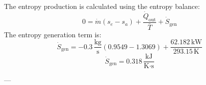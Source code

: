 The entropy production is calculated using the entropy balance:  
\[
0 = \dot{m} (s_e - s_a) + \frac{\dot{Q}_{\text{out}}}{\bar{T}} + \dot{S}_{\text{gen}}
\]  
The entropy generation term is:  
\[
\dot{S}_{\text{gen}} = -0.3 \, \frac{\text{kg}}{\text{s}} \left( 0.9549 - 1.3069 \right) + \frac{62.182 \, \text{kW}}{293.15 \, \text{K}}
\]  
\[
\dot{S}_{\text{gen}} = 0.318 \, \frac{\text{kJ}}{\text{K·s}}
\]  

---